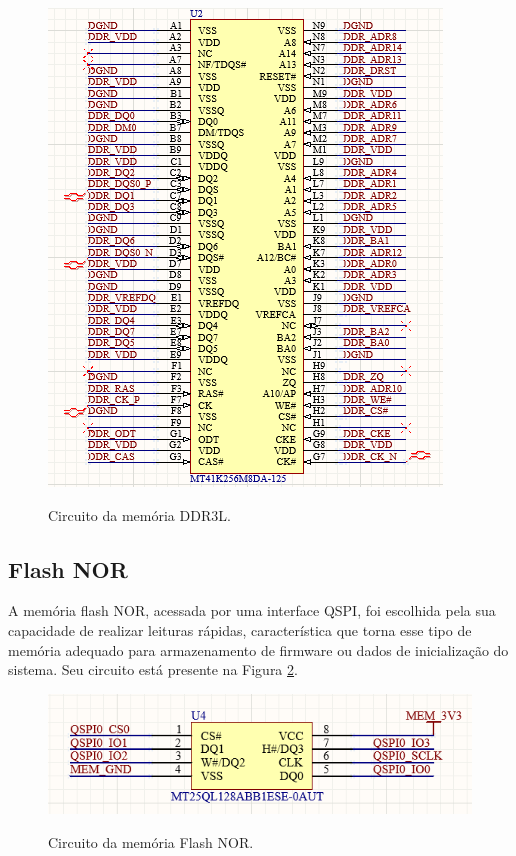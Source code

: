\begin{figure}[H]
    \centering
    \caption{Circuito da memória DDR3L.}
    \includegraphics[scale=0.7]{images/ddr3l.png}
    \label{fig:ddr3l}
\end{figure}

\subsection{Flash NOR}

A memória flash NOR, acessada por uma interface QSPI, foi escolhida pela sua capacidade de realizar leituras rápidas, característica que torna esse tipo de memória adequado para armazenamento de firmware ou dados de inicialização do sistema. Seu circuito está presente na Figura \ref{fig:fnor}.

\begin{figure}[H]
    \centering
    \caption{Circuito da memória Flash NOR.}
    \includegraphics[scale=0.7]{images/flash nor.png}
    \label{fig:fnor}
\end{figure}


